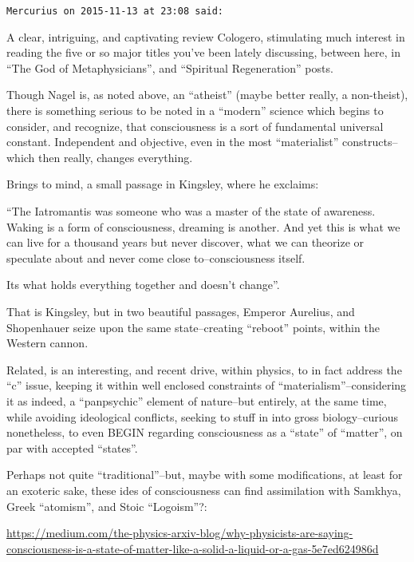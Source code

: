\begin{footnotesize}\begin{sffamily}

\texttt{Mercurius on 2015-11-13 at 23:08 said: }

A clear, intriguing, and captivating review Cologero, stimulating much interest in reading the five or so major titles
you've been lately discussing, between here, in “The God of Metaphysicians”, and “Spiritual Regeneration”
posts.

Though Nagel is, as noted above, an “atheist” (maybe better really, a non-theist), there is something serious to be
noted in a “modern” science which begins to consider, and recognize, that consciousness is a sort of fundamental
universal constant. Independent and objective, even in the most “materialist” constructs–which then really, changes
everything.

Brings to mind, a small passage in Kingsley, where he exclaims:

“The Iatromantis was someone who was a master of the state of awareness. Waking is a form of consciousness, dreaming is
another. And yet this is what we can live for a thousand years but never discover, what we can theorize or speculate
about and never come close to–consciousness itself.

Its what holds everything together and doesn't change”.

That is Kingsley, but in two beautiful passages, Emperor Aurelius, and Shopenhauer seize upon the same state–creating
“reboot” points, within the Western cannon.

Related, is an interesting, and recent drive, within physics, to in fact address the “c” issue, keeping it within well
enclosed constraints of “materialism”–considering it as indeed, a “panpsychic” element of nature–but entirely, at the
same time, while avoiding ideological conflicts, seeking to stuff in into gross biology–curious nonetheless, to even
BEGIN regarding consciousness as a “state” of “matter”, on par with accepted “states”. 

Perhaps not quite “traditional”–but, maybe with some modifications, at least for an exoteric sake, these ides of
consciousness can find assimilation with Samkhya, Greek “atomism”, and Stoic “Logoism”?:

\url{https://medium.com/the-physics-arxiv-blog/why-physicists-are-saying-consciousness-is-a-state-of-matter-like-a-solid-a-liquid-or-a-gas-5e7ed624986d}


\hfill


\end{sffamily}
\end{footnotesize}
